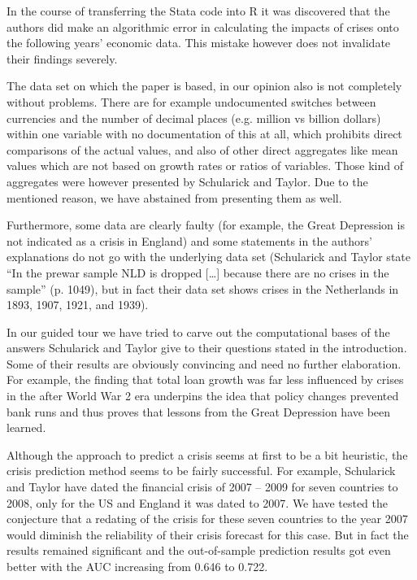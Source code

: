 \documentclass[a4paper,11pt,abstract=on]{scrartcl}
\begin{document}
In the course of transferring the Stata code into R it was discovered that the authors did make an algorithmic error in calculating the impacts of crises onto the following years’ economic data. This mistake however does not invalidate their findings severely. 

The data set on which the paper is based, in our opinion also is not completely without problems. There are for example undocumented switches between currencies and the number of decimal places (e.g. million vs billion dollars) within one variable with no documentation of this at all, which prohibits direct comparisons of the actual values, and also of other direct aggregates like mean values which are not based on growth rates or ratios of variables. Those kind of aggregates were however presented by Schularick and Taylor. Due to the mentioned reason, we have abstained from presenting them as well. 

Furthermore, some data are clearly faulty (for example, the Great Depression is not indicated as a crisis in England) and some statements in the authors’ explanations do not go with the underlying data set (Schularick and Taylor state “In the prewar sample NLD is dropped […] because there are no crises in the sample” (p. 1049), but in fact their data set shows crises in the Netherlands in 1893, 1907, 1921, and 1939).

In our guided tour we have tried to carve out the computational bases of the answers Schularick and Taylor give to their questions stated in the introduction. Some of their results are obviously convincing and need no further elaboration. For example, the finding that total loan growth was far less influenced by crises in the after World War 2 era underpins the idea that policy changes prevented bank runs and thus proves that lessons from the Great Depression have been learned. 

Although the approach to predict a crisis seems at first to be a bit heuristic, the crisis prediction method seems to be fairly successful. For example, Schularick and Taylor have dated the financial crisis of 2007 – 2009 for seven countries to 2008, only for the US and England it was dated to 2007. We have tested the conjecture that  a redating of the crisis for these seven countries to the year 2007 would diminish the reliability of their crisis forecast for this case. But in fact the results remained significant and the out-of-sample prediction results got even better with the AUC increasing from 0.646 to 0.722.
\end{document}
